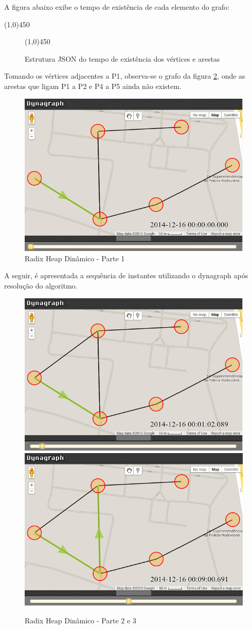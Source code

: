 A figura abaixo exibe o tempo de existência de cada elemento do grafo:
\begin{center}
  \line(1,0){450}
\end{center}

\begin{figure}[htbp]
  \begin{center}
    \line(1,0){450}
  \end{center}
  \centering
  \caption{Estrutura JSON do tempo de existência dos vértices e arestas}
  \label{fig:datatime}
\end{figure}
\FloatBarrier

Tomando os vértices adjacentes a P1, observa-se o grafo da figura \ref{fig:dyndyn1}, onde as arestas
que ligam P1 a P2 e P4 a P5 ainda não existem.

\begin{figure}[htbp]
\centering
 \includegraphics[width=.55\textwidth]{chapters/fig/dyndyn1.png}
\caption{Radix Heap Dinâmico - Parte 1}
\label{fig:dyndyn1}
\end{figure}
\FloatBarrier

A seguir, é apresentada a sequência de instantes utilizando o dynagraph após resolução do algoritmo.

\begin{figure}[htbp]
\centering
 \includegraphics[width=.45\textwidth]{chapters/fig/dyndyn2.png}
 \includegraphics[width=.45\textwidth]{chapters/fig/dyndyn3.png}
\caption{Radix Heap Dinâmico - Parte 2 e 3}
\label{fig:dyndyn2}
\end{figure}
\FloatBarrier

